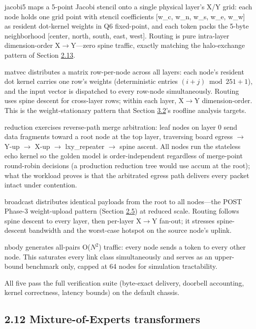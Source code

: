 \documentclass[12pt,onecolumn]{article}
\begin{document}
jacobi5 maps a 5-point Jacobi stencil onto a single physical layer's X/Y grid: each node holds one grid point with stencil coefficients [w\_c, w\_n, w\_s, w\_e, w\_w] as resident dot-kernel weights in Q6 fixed-point, and each token packs the 5-byte neighborhood [center, north, south, east, west]. Routing is pure intra-layer dimension-order X$\rightarrow$Y---zero spine traffic, exactly matching the halo-exchange pattern of Section \hyperref[sec:2.13]{2.13}.

matvec distributes a matrix row-per-node across all layers: each node's resident dot kernel carries one row's weights (deterministic entries $(i+j) \bmod 251 + 1$), and the input vector is dispatched to every row-node simultaneously. Routing uses spine descent for cross-layer rows; within each layer, X$\rightarrow$Y dimension-order. This is the weight-stationary pattern that Section \hyperref[sec:3.2]{3.2}'s roofline analysis targets.

reduction exercises reverse-path merge arbitration: leaf nodes on layer 0 send data fragments toward a root node at the top layer, traversing board egress $\rightarrow$ Y-up $\rightarrow$ X-up $\rightarrow$ lxy\_repeater $\rightarrow$ spine ascent. All nodes run the stateless echo kernel so the golden model is order-independent regardless of merge-point round-robin decisions (a production reduction tree would use accum at the root); what the workload proves is that the arbitrated egress path delivers every packet intact under contention.

broadcast distributes identical payloads from the root to all nodes---the POST Phase-3 weight-upload pattern (Section \hyperref[sec:2.5]{2.5}) at reduced scale. Routing follows spine descent to every layer, then per-layer X$\rightarrow$Y fan-out; it stresses spine-descent bandwidth and the worst-case hotspot on the source node's uplink.

nbody generates all-pairs O($N^2$) traffic: every node sends a token to every other node. This saturates every link class simultaneously and serves as an upper-bound benchmark only, capped at 64 nodes for simulation tractability.

All five pass the full verification suite (byte-exact delivery, doorbell accounting, kernel correctness, latency bounds) on the default chassis.

\subsection*{2.12 Mixture-of-Experts transformers}\label{sec:2.12}
\end{document}
